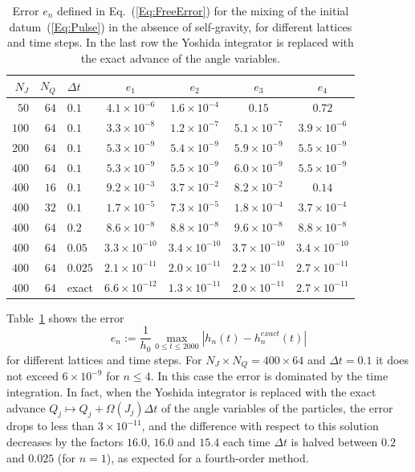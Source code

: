 \begin{table}[htp]
\begin{center}
\begin{tabular}{rrl|cccc}
\hline\hline
$N_J$ & $N_Q$ & $\Delta t$ & $e_1$ & $e_2$ & $e_3$ & $e_4$ \\
\hline
$50$ & $64$ & $0.1$ & $4.1\times 10^{-6}$ & $1.6\times 10^{-4}$ & $0.15$ & $0.72$ \\
$100$ & $64$ & $0.1$ & $3.3\times 10^{-8}$ & $1.2\times 10^{-7}$ & $5.1\times 10^{-7}$ & $3.9\times 10^{-6}$ \\
$200$ & $64$ & $0.1$ & $5.3\times 10^{-9}$ & $5.4\times 10^{-9}$ & $5.9\times 10^{-9}$ & $5.5\times 10^{-9}$ \\
$400$ & $64$ & $0.1$ & $5.3\times 10^{-9}$ & $5.5\times 10^{-9}$ & $6.0\times 10^{-9}$ & $5.5\times 10^{-9}$ \\
\hline
$400$ & $16$ & $0.1$ & $9.2\times 10^{-3}$ & $3.7\times 10^{-2}$ & $8.2\times 10^{-2}$ & $0.14$ \\
$400$ & $32$ & $0.1$ & $1.7\times 10^{-5}$ & $7.3\times 10^{-5}$ & $1.8\times 10^{-4}$ & $3.7\times 10^{-4}$ \\
\hline
$400$ & $64$ & $0.2$ & $8.6\times 10^{-8}$ & $8.8\times 10^{-8}$ & $9.6\times 10^{-8}$ & $8.8\times 10^{-8}$ \\
$400$ & $64$ & $0.05$ & $3.3\times 10^{-10}$ & $3.4\times 10^{-10}$ & $3.7\times 10^{-10}$ & $3.4\times 10^{-10}$ \\
$400$ & $64$ & $0.025$ & $2.1\times 10^{-11}$ & $2.0\times 10^{-11}$ & $2.2\times 10^{-11}$ & $2.7\times 10^{-11}$ \\
$400$ & $64$ & exact & $6.6\times 10^{-12}$ & $1.3\times 10^{-11}$ & $2.0\times 10^{-11}$ & $2.7\times 10^{-11}$ \\
\hline\hline
\end{tabular}
\end{center}
\caption{Error $e_n$ defined in Eq.~(\ref{Eq:FreeError}) for the mixing of the initial datum~(\ref{Eq:Pulse}) in the absence of self-gravity, for different lattices and time steps. In the last row the Yoshida integrator is replaced with the exact advance of the angle variables.}
\label{Tab:FreeMixing}
\end{table}

Table~\ref{Tab:FreeMixing} shows the error
\begin{equation}
e_n := \frac{1}{h_0}\max\limits_{0\leq t\leq 2000} \left| h_n(t) - h_n^{exact}(t) \right|
\label{Eq:FreeError}
\end{equation}
for different lattices and time steps. For $N_J\times N_Q = 400\times 64$ and $\Delta t = 0.1$ it does not exceed $6\times 10^{-9}$ for $n\leq 4$. In this case the error is dominated by the time integration. In fact, when the Yoshida integrator is replaced with the exact advance $Q_j\mapsto Q_j + \Omega(J_j)\Delta t$ of the angle variables of the particles, the error drops to less than $3\times 10^{-11}$, and the difference with respect to this solution decreases by the factors $16.0$, $16.0$ and $15.4$ each time $\Delta t$ is halved between $0.2$ and $0.025$ (for $n = 1$), as expected for a fourth-order method.

